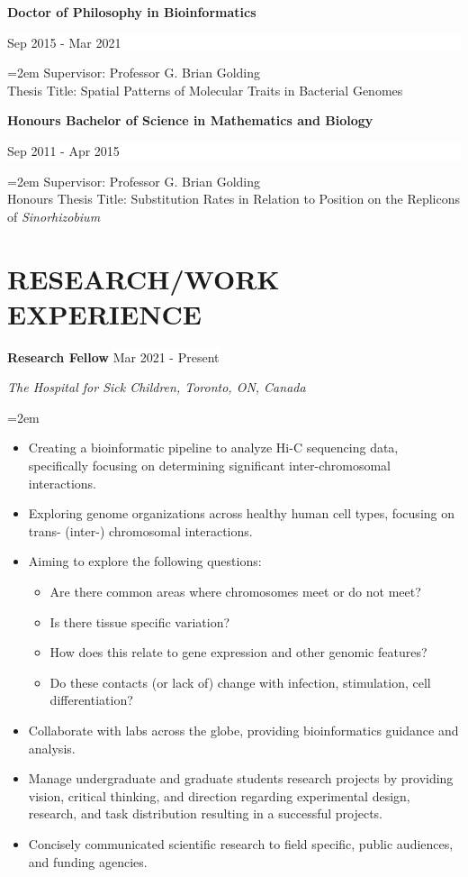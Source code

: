 \documentclass[paper=a4,fontsize=11pt]{scrartcl}	 			%
\newcommand{\sepspace}{\vspace*{1em}}			%
\newcommand{\NewPart}[1]{\section*{\uppercase{#1}}}
\newcommand{\EducationEntry}[4]{
		\noindent \textbf{#1} \hfill 					%
		\colorbox{White}{%
			\parbox{10em}{%
			\hfill\color{Black}#2}} \par				%
		\noindent \textit{#3} \par					%
		\noindent\hangindent=2em\hangafter=0 \small #4 	%
		\normalsize \par}
\newcommand{\EducationEntryB}[3]{
	\indent \textbf{#1} \hfill 					%
	\colorbox{White}{%
		\parbox{10em}{%
			\hfill\color{Black}#2}} \par	%
	\indent\hangindent=2em\hangafter=0 \small #3 	%
	\normalsize \par}
\newcommand{\WorkEntry}[4]{						%
		\noindent \textbf{#1} \hfill 					%
		\colorbox{White}{\color{Black}#2} \par		%
		\noindent \textit{#3} \par					%
		\noindent\hangindent=2em\hangafter=0 \small #4 	%
		\normalsize \par}
\begin{document}
\EducationEntryB{Doctor of Philosophy in Bioinformatics}{Sep 2015 - Mar 2021}{Supervisor: Professor G. Brian Golding\\
	Thesis Title: Spatial Patterns of Molecular Traits in Bacterial Genomes}
\EducationEntryB{Honours Bachelor of Science in Mathematics and Biology}{Sep 2011 - Apr 2015}{Supervisor: Professor G. Brian Golding\\
	Honours Thesis Title: Substitution Rates in Relation to Position on the Replicons of \textit{Sinorhizobium}}
%
%



\NewPart{Research/Work Experience}{}
\WorkEntry{Research Fellow}{Mar 2021 - Present}{The Hospital for Sick Children, Toronto, ON, Canada}{
	\begin{itemize}
		\item Creating a bioinformatic pipeline to analyze Hi-C sequencing data, specifically focusing on determining significant inter-chromosomal interactions.
		\item Exploring genome organizations across healthy human cell types, focusing on trans- (inter-) chromosomal interactions.
		\item Aiming to explore the following questions:
		\begin{itemize}
			\item Are there common areas where chromosomes meet or do not meet?
			\item Is there tissue specific variation?
			\item How does this relate to gene expression and other genomic features?
			\item Do these contacts (or lack of) change with infection, stimulation, cell differentiation?
		\end{itemize}
	\item Collaborate with labs across the globe, providing bioinformatics guidance and analysis.
		\item Manage undergraduate and graduate students research projects by providing vision, critical thinking, and direction regarding experimental design, research, and task distribution resulting in a successful projects.
	\item Concisely communicated scientific research to field specific, public audiences, and funding agencies.
\end{itemize}}
\end{document}

